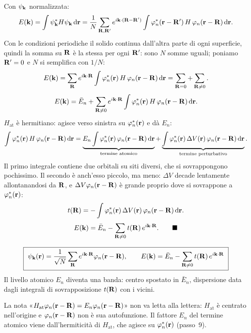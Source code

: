 \documentclass[11pt,a4paper]{article}
\begin{document}
\begin{dimostrazione}
Con $\psi_{\mathbf k}$ normalizzata:
\[
E(\mathbf k)=\int\psi_{\mathbf k}^*H\psi_{\mathbf k}\,\mathrm d\mathbf r=\frac1N\sum_{\mathbf R,\mathbf R'}e^{i\mathbf k\cdot(\mathbf R-\mathbf R')}\int\varphi_n^*(\mathbf r-\mathbf R')\,H\,\varphi_n(\mathbf r-\mathbf R)\,\mathrm d\mathbf r .
\]
Con le condizioni periodiche il solido continua dall'altra parte di ogni superficie, quindi la somma su $\mathbf R$ è la stessa per ogni $\mathbf R'$: sono $N$
somme uguali; poniamo $\mathbf R'=0$ e $N$ si semplifica con $1/N$:
\[
E(\mathbf k)=\sum_{\mathbf R}e^{i\mathbf k\cdot\mathbf R}\int\varphi_n^*(\mathbf r)\,H\,\varphi_n(\mathbf r-\mathbf R)\,\mathrm d\mathbf r=\sum_{\mathbf R=0}+\sum_{\mathbf R\ne0}.
\]
\[
E(\mathbf k)=\bar E_n+\sum_{\mathbf R\ne0}e^{i\mathbf k\cdot\mathbf R}\int\varphi_n^*(\mathbf r)\,H\,\varphi_n(\mathbf r-\mathbf R)\,\mathrm d\mathbf r .
\]
$H_{\mathrm{at}}$ è hermitiano: agisce verso sinistra su $\varphi_n^*(\mathbf r)$ e dà $E_n$:
\[
\int\varphi_n^*(\mathbf r)\,H\,\varphi_n(\mathbf r-\mathbf R)\,\mathrm d\mathbf r=\underbrace{E_n\int\varphi_n^*(\mathbf r)\,\varphi_n(\mathbf r-\mathbf R)\,\mathrm d\mathbf r}_{\text{termine atomico}}
+\underbrace{\int\varphi_n^*(\mathbf r)\,\Delta V(\mathbf r)\,\varphi_n(\mathbf r-\mathbf R)\,\mathrm d\mathbf r}_{\text{termine perturbativo}} .
\]
Il primo integrale contiene due orbitali su siti diversi, che si sovrappongono pochissimo. Il secondo è anch'esso piccolo, ma meno: $\Delta V$ decade
lentamente allontanandosi da $\mathbf R$, e $\Delta V\varphi_n(\mathbf r-\mathbf R)$ è grande proprio dove si sovrappone a $\varphi_n^*(\mathbf r)$:
\[
t(\mathbf R)=-\int\varphi_n^*(\mathbf r)\,\Delta V(\mathbf r)\,\varphi_n(\mathbf r-\mathbf R)\,\mathrm d\mathbf r .
\]
\[
E(\vk)=\bar E_n-\sum_{\vR\ne0}t(\vR)\,e^{i\vk\cdot\vR}.\qed
\]
\end{dimostrazione}

\begin{chiave}
\[
\boxed{\ \psi_{\mathbf k}(\mathbf r)=\frac1{\sqrt N}\sum_{\mathbf R}e^{i\mathbf k\cdot\mathbf R}\varphi_n(\mathbf r-\mathbf R),\qquad E(\mathbf k)=\bar E_n-\sum_{\mathbf R\ne0}t(\mathbf R)\,e^{i\mathbf k\cdot\mathbf R}\ }
\]
Il livello atomico $E_n$ diventa una banda: centro spostato in $\bar E_n$, dispersione data dagli integrali di sovrapposizione $t(\mathbf R)$ con i vicini.
\end{chiave}

\begin{osservazione}
La nota «$H_{\mathrm{at}}\varphi_n(\mathbf r-\mathbf R)=E_n\varphi_n(\mathbf r-\mathbf R)$» non va letta alla lettera: $H_{\mathrm{at}}$ è centrato nell'origine e
$\varphi_n(\mathbf r-\mathbf R)$ non è sua autofunzione. Il fattore $E_n$ del termine atomico viene dall'hermiticità di $H_{\mathrm{at}}$, che agisce su
$\varphi_n^*(\mathbf r)$ (passo~9).
\end{osservazione}
\end{document}
